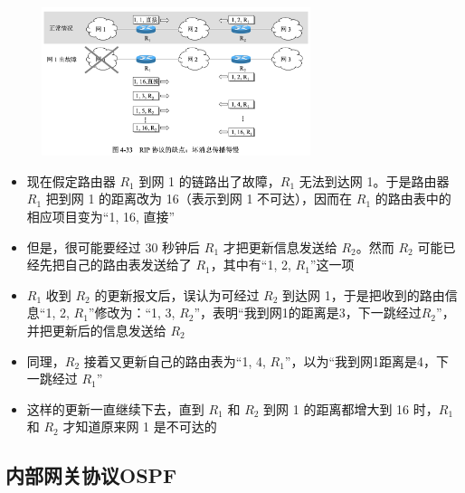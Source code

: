 \documentclass[cs4size,a4paper,10pt]{ctexart}
\begin{document}
	\begin{figure}[H]
		\centering
		\includegraphics[width=0.7\textwidth]{img/4.33}
	\end{figure}
	\begin{itemize}
		\item 现在假定路由器 $R_1$ 到网 1 的链路出了故障，$R_1$ 无法到达网 1。于是路由器 $R_1$ 把到网 1 的距离改为 16（表示到网 1 不可达），因而在 $R_1$ 的路由表中的相应项目变为“1, 16, 直接”
		\item 但是，很可能要经过 30 秒钟后 $R_1$ 才把更新信息发送给 $R_2$。然而 $R_2$ 可能已经先把自己的路由表发送给了 $R_1$，其中有“1, 2, $R_1$”这一项
		\item $R_1$ 收到 $R_2$ 的更新报文后，误认为可经过 $R_2$ 到达网 1，于是把收到的路由信息“1, 2, $R_1$”修改为：“1, 3, $R_2$”，表明“我到网1的距离是3，下一跳经过$R_2$”，并把更新后的信息发送给 $R_2$
		\item 同理，$R_2$ 接着又更新自己的路由表为“1, 4, $R_1$”，以为“我到网1距离是4，下一跳经过 $R_1$”
		\item 这样的更新一直继续下去，直到 $R_1$ 和 $R_2$ 到网 1 的距离都增大到 16 时，$R_1$ 和 $R_2$ 才知道原来网 1 是不可达的
	\end{itemize}

	\subsection{内部网关协议OSPF}
\end{document}

